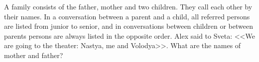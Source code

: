\problem{}
A family consists of the father, mother and two children.
They call each other by their names.
In a conversation between a parent and a child, all referred persons are listed from junior to senior,
and in conversations between children or between parents persons are always listed in the opposite order.
Alex said to Sveta: <<We are going to the theater: Nastya, me and Volodya>>.
What are the names of mother and father?
\solution
\endproblem
